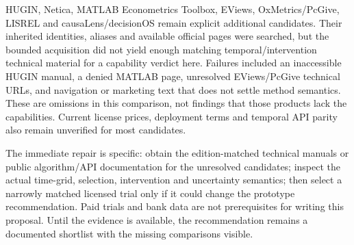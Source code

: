 HUGIN, Netica, MATLAB Econometrics Toolbox, EViews, OxMetrics/PcGive,
LISREL and causaLens/decisionOS remain explicit additional candidates.
Their inherited identities, aliases and available official pages were
searched, but the bounded acquisition did not yield enough matching
temporal/intervention technical material for a capability verdict here.
Failures included an inaccessible HUGIN manual, a denied MATLAB page,
unresolved EViews/PcGive technical URLs, and navigation or marketing
text that does not settle method semantics. These are omissions in this
comparison, not findings that those products lack the capabilities.
Current license prices, deployment terms and temporal API parity also
remain unverified for most candidates.

The immediate repair is specific: obtain the edition-matched technical
manuals or public algorithm/API documentation for the unresolved
candidates; inspect the actual time-grid, selection, intervention and
uncertainty semantics; then select a narrowly matched licensed trial
only if it could change the prototype recommendation. Paid trials and
bank data are not prerequisites for writing this proposal. Until the
evidence is available, the recommendation remains a documented shortlist
with the missing comparisons visible.

\label{exec13:commercial-temporal-end}
